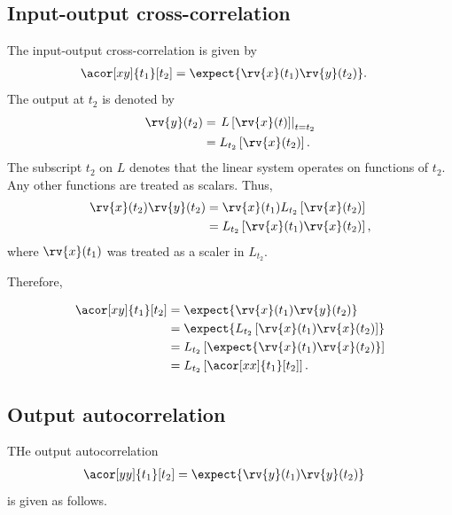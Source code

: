 \subsection{Input-output cross-correlation}
The input-output cross-correlation is given by
\begin{align}
    \acor[xy]{t_{1}}[t_{2}] &= \expect{\rv{x}(t_{1})\rv{y}(t_{2})}.
\end{align}
The output at $t_{2}$ is denoted by
\begin{align}
    \rv{y}(t_{2}) &= \left.L\left[ \rv{x}(t) \right]\right|_{t=t_{2}}\\
    &= L_{t_{2}}\left[ \rv{x}(t_{2}) \right].
\end{align}
The subscript $t_{2}$ on $L$ denotes that the linear system operates on functions of $t_{2}$. Any other functions are treated as scalars.
Thus, 
\begin{align}
    \rv{x}(t_{2})\rv{y}(t_{2}) &= \rv{x}(t_{1})L_{t_{2}}\left[ \rv{x}(t_{2}) \right]\\
    &= L_{t_{2}}\left[ \rv{x}(t_{1})\rv{x}(t_{2}) \right],
\end{align}
where $\rv{x}(t_{1})$ was treated as a scaler in $L_{t_{2}}$.

Therefore,
\begin{blueBox}
    \begin{align}
        \acor[xy]{t_{1}}[t_{2}] &= \expect{\rv{x}(t_{1})\rv{y}(t_{2})} \\
        &= \expect{ L_{t_{2}}\left[ \rv{x}(t_{1})\rv{x}(t_{2}) \right]}\\
        &= L_{t_{2}}\left[ \expect{\rv{x}(t_{1})\rv{x}(t_{2})} \right]\\
        &= L_{t_{2}}\left[ \acor[xx]{t_{1}}[t_{2}] \right].
    \end{align}
\end{blueBox}

\subsection{Output autocorrelation}
THe output autocorrelation 
\begin{align}
    \acor[yy]{t_{1}}[t_{2}] &= \expect{\rv{y}(t_{1})\rv{y}(t_{2})}
\end{align}
is given as follows.

